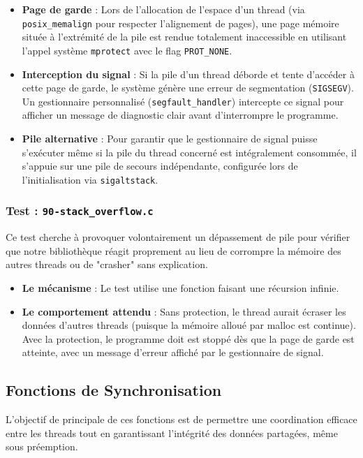 \begin{itemize}
    \item \textbf{Page de garde} : Lors de l'allocation de l'espace d'un thread (via \texttt{posix\_memalign} pour respecter l'alignement de pages), une page mémoire située à l'extrémité de la pile est rendue totalement inaccessible en utilisant l'appel système \texttt{mprotect} avec le flag \texttt{PROT\_NONE}.
    \item \textbf{Interception du signal} : Si la pile d'un thread déborde et tente d'accéder à cette page de garde, le système génère une erreur de segmentation (\texttt{SIGSEGV}). Un gestionnaire personnalisé (\texttt{segfault\_handler}) intercepte ce signal pour afficher un message de diagnostic clair avant d'interrompre le programme.
    \item \textbf{Pile alternative} : Pour garantir que le gestionnaire de signal puisse s'exécuter même si la pile du thread concerné est intégralement consommée, il s'appuie sur une pile de secours indépendante, configurée lors de l'initialisation via \texttt{sigaltstack}.
\end{itemize}

\subsubsection{Test : \texttt{90-stack\_overflow.c}}
Ce test cherche à provoquer volontairement un dépassement de pile pour vérifier que notre bibliothèque réagit proprement
 au lieu de corrompre la mémoire des autres threads ou de "crasher" sans explication.
\begin{itemize}
\item \textbf{Le mécanisme} : Le test utilise une fonction faisant une récursion infinie.
\item \textbf{Le comportement attendu} : Sans protection, le thread aurait écraser les données d'autres threads 
(puisque la mémoire alloué par malloc est continue). Avec la protection, le programme doit est stoppé dès que la 
page de garde est atteinte, avec un message d'erreur affiché par le gestionnaire de signal.
\end{itemize}

\subsection{Fonctions de Synchronisation}
L'objectif de principale de ces fonctions est de permettre une coordination efficace entre les threads tout en 
garantissant l'intégrité des données partagées, même sous préemption.


